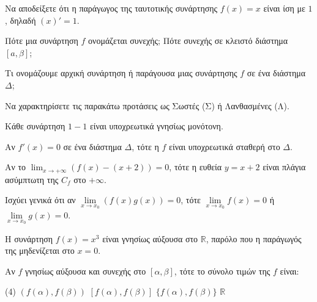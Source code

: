 \documentclass[11pt,a4paper]{article}
\newcommand{\kerkissans}[1]{{\fontfamily{maksf}\selectfont \textbf{#1}}}
\renewcommand{\textdexiakeraia}{}
\newcommand\themanum{A}
\newcounter{thema}[section]
\renewcommand{\thethema}{\arabic{thema}}
\newcommand{\Thema}{\refstepcounter{thema}{\textbf{\textcolor{black}{\faPenSquare\ \  \large \kerkissans{\textbf{\thethemaο\hspace{2mm}Διαγώνισμα - Θέμα \themanum}}}}}\hspace{0mm}}{}
\newenvironment{thema}[1]
{\begin{tcolorbox}[title=\Thema\kerkissans{\textbf{\large{  #1}}},breakable,
enhanced standard,titlerule=0pt,toprule=0pt, rightrule=0pt, bottomrule=0pt,
colback=white,left=0mm,top=1mm,bottom=0mm,
boxrule=0pt,
colframe=white,leftrule=0mm,sharp corners,coltitle=black]
\renewcommand{\themanum}{#1}}
{\end{tcolorbox}}
\begin{document}
\begin{thema}{A}
\begin{erwthma}
    \item Να αποδείξετε ότι η παράγωγος της ταυτοτικής συνάρτησης $f(x) = x$ είναι ίση με $1$, δηλαδή $(x)' = 1$.
    \item Πότε μια συνάρτηση $f$ ονομάζεται συνεχής; Πότε συνεχής σε κλειστό διάστημα $[a, \beta]$;
    \item Τι ονομάζουμε αρχική συνάρτηση ή παράγουσα μιας συνάρτησης $f$ σε ένα διάστημα $\Delta$;
    \item Να χαρακτηρίσετε τις παρακάτω προτάσεις ως Σωστές (Σ) ή Λανθασμένες (Λ).
    \begin{alist}
        \item Κάθε συνάρτηση $1-1$ είναι υποχρεωτικά γνησίως μονότονη.
        \item Αν $f'(x) = 0$ σε ένα διάστημα $\Delta$, τότε η $f$ είναι υποχρεωτικά σταθερή στο $\Delta$.
        \item Αν το $\lim_{x\to +\infty} (f(x) - (x+2)) = 0$, τότε η ευθεία $y = x+2$ είναι πλάγια ασύμπτωτη της $C_f$ στο $+\infty$.
        \item Ισχύει γενικά ότι αν $\lim\limits_{x\to x_0} (f(x)g(x)) = 0$, τότε $\lim\limits_{x\to x_0} f(x) = 0$ ή $\lim\limits_{x\to x_0} g(x) = 0$.
        \item Η συνάρτηση $f(x) = x^3$ είναι γνησίως αύξουσα στο $\mathbb{R}$, παρόλο που η παράγωγός της μηδενίζεται στο $x=0$.
    \end{alist}
    \item Αν $f$ γνησίως αύξουσα και συνεχής στο $[\alpha, \beta]$, τότε το σύνολο τιμών της $f$ είναι:
    \begin{tasks}[label=\let\textdexiakeraia\relax\alph*.](4)
        \task $(f(\alpha), f(\beta))$
        \task $[f(\alpha), f(\beta)]$
        \task $\{f(\alpha), f(\beta)\}$
        \task $\mathbb{R}$
    \end{tasks}
\end{erwthma}
\end{thema}
\vspace{1cm}
\end{document}
